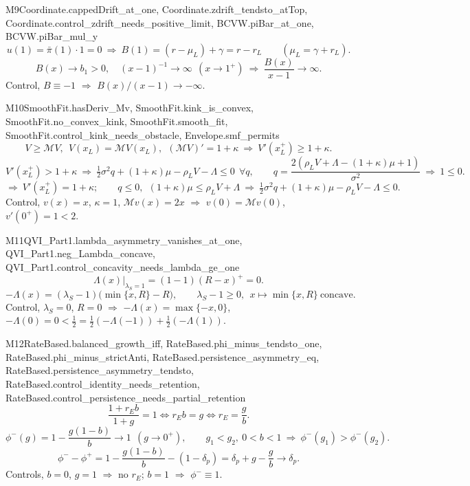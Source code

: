 \begin{mproof}{M9}{Coordinate.cappedDrift_at_one, Coordinate.zdrift_tendsto_atTop, Coordinate.control_zdrift_needs_positive_limit, BCVW.piBar_at_one, BCVW.piBar_mul_y}
\[ u(1)=\bar\pi(1)\cdot1=0\ \Rightarrow\ B(1)=(r-\mu_L)+\gamma=r-r_L\qquad(\mu_L=\gamma+r_L) . \]
\[ B(x)\to b_1>0,\quad (x-1)^{-1}\to\infty\ \ (x\to1^+)\ \Rightarrow\ \frac{B(x)}{x-1}\to\infty . \]
Control, $B\equiv-1$ $\Rightarrow$ $B(x)/(x-1)\to-\infty$.
\end{mproof}

\begin{mproof}{M10}{SmoothFit.hasDeriv_Mv, SmoothFit.kink_is_convex, SmoothFit.no_convex_kink, SmoothFit.smooth_fit, SmoothFit.control_kink_needs_obstacle, Envelope.smf_permits}
\[ V\ge\mathcal MV,\ \ V(x_L)=\mathcal MV(x_L),\ \ (\mathcal MV)'=1+\kappa\ \Rightarrow\ V'(x_L^+)\ge1+\kappa . \]
\[ V'(x_L^+)>1+\kappa\ \Rightarrow\ \tfrac12\sigma^2q+(1+\kappa)\mu-\rho_LV-\Lambda\le0\ \ \forall q,\qquad q=\frac{2(\rho_LV+\Lambda-(1+\kappa)\mu+1)}{\sigma^2}\ \Rightarrow\ 1\le0 . \]
\[ \Rightarrow\ V'(x_L^+)=1+\kappa;\qquad q\le0,\ \ (1+\kappa)\mu\le\rho_LV+\Lambda\ \Rightarrow\ \tfrac12\sigma^2q+(1+\kappa)\mu-\rho_LV-\Lambda\le0 . \]
Control, $v(x)=x$, $\kappa=1$, $\mathcal Mv(x)=2x$ $\Rightarrow$ $v(0)=\mathcal Mv(0)$, $v'(0^+)=1<2$.
\end{mproof}

\begin{mproof}{M11}{QVI_Part1.lambda_asymmetry_vanishes_at_one, QVI_Part1.neg_Lambda_concave, QVI_Part1.control_concavity_needs_lambda_ge_one}
\[ \Lambda(x)\big|_{\lambda_S=1}=(1-1)(R-x)^+=0 . \]
\[ -\Lambda(x)=(\lambda_S-1)\big(\min\{x,R\}-R\big),\qquad \lambda_S-1\ge0,\ \ x\mapsto\min\{x,R\}\ \text{concave} . \]
Control, $\lambda_S=0$, $R=0$ $\Rightarrow$ $-\Lambda(x)=\max\{-x,0\}$, $-\Lambda(0)=0<\tfrac12=\tfrac12(-\Lambda(-1))+\tfrac12(-\Lambda(1))$.
\end{mproof}

\begin{mproof}{M12}{RateBased.balanced_growth_iff, RateBased.phi_minus_tendsto_one, RateBased.phi_minus_strictAnti, RateBased.persistence_asymmetry_eq, RateBased.persistence_asymmetry_tendsto, RateBased.control_identity_needs_retention, RateBased.control_persistence_needs_partial_retention}
\[ \frac{1+r_Eb}{1+g}=1\iff r_Eb=g\iff r_E=\frac gb . \]
\[ \phi^-(g)=1-\frac{g(1-b)}{b}\to1\ \ (g\to0^+),\qquad g_1<g_2,\ 0<b<1\ \Rightarrow\ \phi^-(g_1)>\phi^-(g_2) . \]
\[ \phi^--\phi^+=1-\frac{g(1-b)}b-(1-\delta_p)=\delta_p+g-\frac gb\to\delta_p . \]
Controls, $b=0$, $g=1$ $\Rightarrow$ no $r_E$; $b=1$ $\Rightarrow$ $\phi^-\equiv1$.
\end{mproof}

